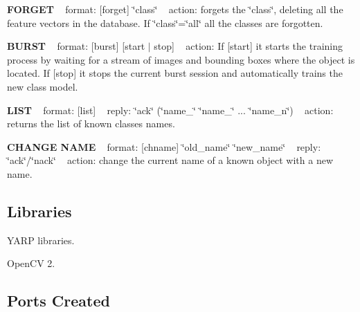 {\bfseries F\+O\+R\+G\+ET} ~\newline
format\+: \mbox{[}forget\mbox{]} \char`\"{}class\char`\"{} ~\newline
action\+: forgets the \char`\"{}class\char`\"{}, deleting all the feature vectors in the database. If \char`\"{}class\char`\"{}=\char`\"{}all\char`\"{} all the classes are forgotten.

{\bfseries B\+U\+R\+ST} ~\newline
format\+: \mbox{[}burst\mbox{]} \mbox{[}start $\vert$ stop\mbox{]} ~\newline
action\+: If \mbox{[}start\mbox{]} it starts the training process by waiting for a stream of images and bounding boxes where the object is located. If \mbox{[}stop\mbox{]} it stops the current burst session and automatically trains the new class model.

{\bfseries L\+I\+ST} ~\newline
format\+: \mbox{[}list\mbox{]} ~\newline
reply\+: \char`\"{}ack\char`\"{} (\char`\"{}name\+\_\char`\"{} \char`\"{}name\+\_\char`\"{} ... \char`\"{}name\+\_\+n\char`\"{}) ~\newline
action\+: returns the list of known classes names.

{\bfseries C\+H\+A\+N\+GE N\+A\+ME} ~\newline
format\+: \mbox{[}chname\mbox{]} \char`\"{}old\+\_\+name\char`\"{} \char`\"{}new\+\_\+name\char`\"{} ~\newline
reply\+: \char`\"{}ack\char`\"{}/\char`\"{}nack\char`\"{} ~\newline
action\+: change the current name of a known object with a new name.\hypertarget{group__icub__iolStateMachineHandler_lib_sec}{}\subsection{Libraries}\label{group__icub__iolStateMachineHandler_lib_sec}

\begin{DoxyItemize}
\item Y\+A\+RP libraries.
\item Open\+CV 2.
\end{DoxyItemize}\hypertarget{group__icub__iolStateMachineHandler_portsc_sec}{}\subsection{Ports Created}\label{group__icub__iolStateMachineHandler_portsc_sec}


